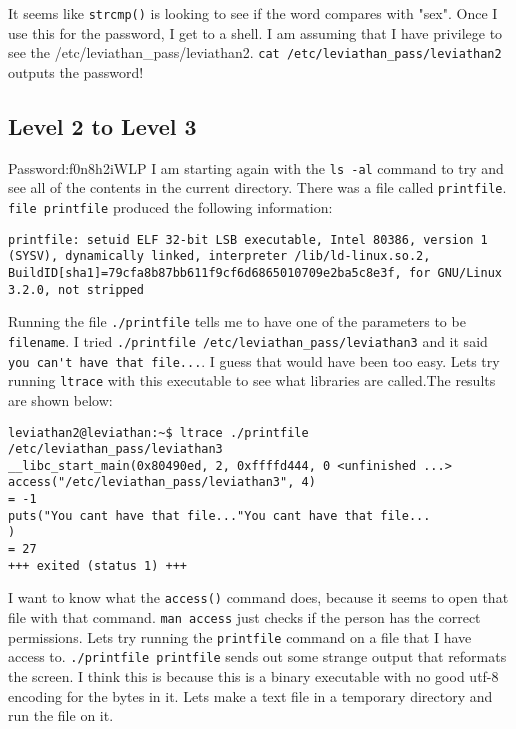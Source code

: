 \documentclass[11pt]{article}
\begin{document}
It seems like \verb|strcmp()| is looking to see if the word compares with "sex". Once I use this for the password, I get to a shell. I am assuming that I have privilege to see the /etc/leviathan\_pass/leviathan2. \verb|cat /etc/leviathan_pass/leviathan2| outputs the password!


\subsection*{Level 2 to Level 3}
Password:f0n8h2iWLP
I am starting again with the \verb|ls -al| command to try and see all of the contents in the current directory. There was a file called \verb|printfile|. \verb|file printfile| produced the following information:

\begin{lstlisting}
printfile: setuid ELF 32-bit LSB executable, Intel 80386, version 1 (SYSV), dynamically linked, interpreter /lib/ld-linux.so.2, BuildID[sha1]=79cfa8b87bb611f9cf6d6865010709e2ba5c8e3f, for GNU/Linux 3.2.0, not stripped
\end{lstlisting}

Running the file \verb|./printfile| tells me to have one of the parameters to be \verb|filename|. I tried \verb|./printfile /etc/leviathan_pass/leviathan3| and it said \verb|you can't have that file...|. I guess that would have been too easy. Lets try running \verb|ltrace| with this executable to see what libraries are called.The results are shown below:

\begin{lstlisting}
leviathan2@leviathan:~$ ltrace ./printfile /etc/leviathan_pass/leviathan3
__libc_start_main(0x80490ed, 2, 0xffffd444, 0 <unfinished ...>
access("/etc/leviathan_pass/leviathan3", 4)                                                              = -1
puts("You cant have that file..."You cant have that file...
)                                                                       = 27
+++ exited (status 1) +++
\end{lstlisting}

I want to know what the \verb|access()| command does, because it seems to open that file with that command. \verb|man access| just checks if the person has the correct permissions. Lets try running the \verb|printfile| command on a file that I have access to. \verb|./printfile printfile| sends out some strange output that reformats the screen. I think this is because this is a binary executable with no good utf-8 encoding for the bytes in it. Lets make a text file in a temporary directory and run the file on it. 
\end{document}
